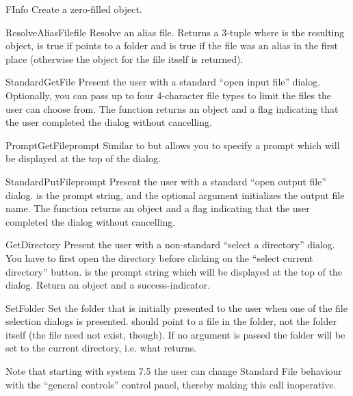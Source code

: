 \begin{funcdesc}{FInfo}{}
Create a zero-filled  object.
\end{funcdesc}

\begin{funcdesc}{ResolveAliasFile}{file}
Resolve an alias file. Returns a 3-tuple  where  is the resulting
 object,  is true if  points
to a folder and  is true if the file was an alias in the
first place (otherwise the  object for the file itself
is returned).
\end{funcdesc}

\begin{funcdesc}{StandardGetFile}{}
Present the user with a standard ``open input file''
dialog. Optionally, you can pass up to four 4-character file types to limit
the files the user can choose from. The function returns an 
object and a flag indicating that the user completed the dialog
without cancelling.
\end{funcdesc}

\begin{funcdesc}{PromptGetFile}{prompt}
Similar to  but allows you to specify a
prompt which will be displayed at the top of the dialog.
\end{funcdesc}

\begin{funcdesc}{StandardPutFile}{prompt}
Present the user with a standard ``open output file''
dialog.  is the prompt string, and the optional
 argument initializes the output file name. The function
returns an  object and a flag indicating that the user
completed the dialog without cancelling.
\end{funcdesc}

\begin{funcdesc}{GetDirectory}{}
Present the user with a non-standard ``select a directory'' dialog.  You
have to first open the directory before clicking on the ``select current
directory'' button.  is the prompt string which will be
displayed at the top of the dialog. Return an  object and
a success-indicator.
\end{funcdesc}

\begin{funcdesc}{SetFolder}{}
Set the folder that is initially presented to the user when one of
the file selection dialogs is presented.  should point to
a file in the folder, not the folder itself (the file need not exist,
though). If no argument is passed the folder will be set to the
current directory, i.e. what  returns.

Note that starting with system 7.5 the user can change Standard File
behaviour with the ``general controls'' control panel, thereby making
this call inoperative.
\end{funcdesc}

